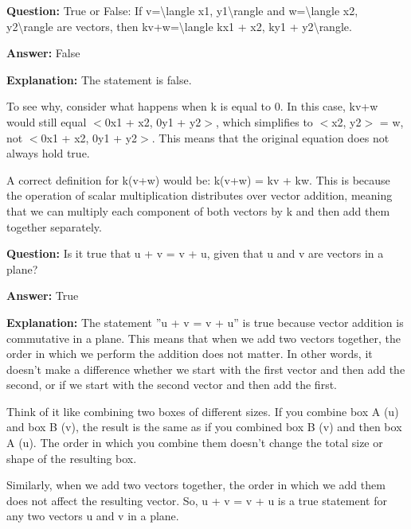 \documentclass{article}
\begin{document}
                \vspace{0.5cm} 
        
            
                \textbf {Question:} True or False: If v={\textbackslash}langle x1, y1{\textbackslash}rangle and w={\textbackslash}langle x2, y2{\textbackslash}rangle are vectors, then kv+w={\textbackslash}langle kx1 + x2, ky1 + y2{\textbackslash}rangle.
                
                \textbf{Answer:} False

                \textbf{Explanation:} The statement is false.

To see why, consider what happens when k is equal to 0. In this case, kv+w would still equal \ensuremath{<}0x1 + x2, 0y1 + y2\ensuremath{>}, which simplifies to \ensuremath{<}x2, y2\ensuremath{>} = w, not \ensuremath{<}0x1 + x2, 0y1 + y2\ensuremath{>}. This means that the original equation does not always hold true.

A correct definition for k(v+w) would be: k(v+w) = kv + kw. This is because the operation of scalar multiplication distributes over vector addition, meaning that we can multiply each component of both vectors by k and then add them together separately.
                
                \vspace{0.5cm} 
        
            
                \textbf {Question:} Is it true that u + v = v + u, given that u and v are vectors in a plane?
                
                \textbf{Answer:} True

                \textbf{Explanation:} The statement ''u + v = v + u'' is true because vector addition is commutative in a plane. This means that when we add two vectors together, the order in which we perform the addition does not matter. In other words, it doesn't make a difference whether we start with the first vector and then add the second, or if we start with the second vector and then add the first.

Think of it like combining two boxes of different sizes. If you combine box A (u) and box B (v), the result is the same as if you combined box B (v) and then box A (u). The order in which you combine them doesn't change the total size or shape of the resulting box.

Similarly, when we add two vectors together, the order in which we add them does not affect the resulting vector. So, u + v = v + u is a true statement for any two vectors u and v in a plane.
                
\end{document}
